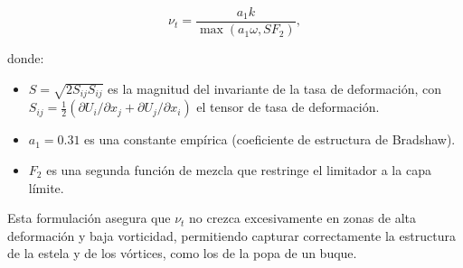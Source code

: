 \begin{equation}
    \nu_t = \frac{a_1 k}{\max(a_1 \omega, S F_2)},
\end{equation}

donde:
\begin{itemize}
    \item $S = \sqrt{2 S_{ij} S_{ij}}$ es la magnitud del invariante de la tasa de deformación, con $S_{ij} = \tfrac{1}{2}(\partial U_i/\partial x_j + \partial U_j/\partial x_i)$ el tensor de tasa de deformación.
    \item $a_1 = 0.31$ es una constante empírica (coeficiente de estructura de Bradshaw).
    \item $F_2$ es una segunda función de mezcla que restringe el limitador a la capa límite.
\end{itemize}

Esta formulación asegura que $\nu_t$ no crezca excesivamente en zonas de alta deformación y baja vorticidad, permitiendo capturar correctamente la estructura de la estela y de los vórtices, como los de la popa de un buque.

